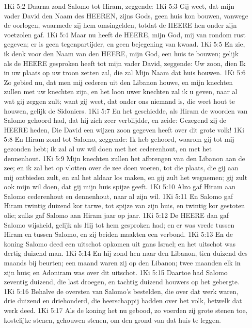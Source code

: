 1Ki 5:2  Daarna zond Salomo tot Hiram, zeggende:
1Ki 5:3  Gij weet, dat mijn vader David den Naam des HEEREN, zijns Gods, geen huis kon bouwen, vanwege de oorlogen, waarmede zij hem omsingelden, totdat de HEERE hen onder zijn voetzolen gaf.
1Ki 5:4  Maar nu heeft de HEERE, mijn God, mij van rondom rust gegeven; er is geen tegenpartijder, en geen bejegening van kwaad.
1Ki 5:5  En zie, ik denk voor den Naam van den HEERE, mijn God, een huis te bouwen; gelijk als de HEERE gesproken heeft tot mijn vader David, zeggende: Uw zoon, dien Ik in uw plaats op uw troon zetten zal, die zal Mijn Naam dat huis bouwen.
1Ki 5:6  Zo gebied nu, dat men mij cederen uit den Libanon houwe, en mijn knechten zullen met uw knechten zijn, en het loon uwer knechten zal ik u geven, naar al wat gij zeggen zult; want gij weet, dat onder ons niemand is, die weet hout te houwen, gelijk de Sidoniers.
1Ki 5:7  En het geschiedde, als Hiram de woorden van Salomo gehoord had, dat hij zich zeer verblijdde, en zeide: Gezegend zij de HEERE heden, Die David een wijzen zoon gegeven heeft over dit grote volk!
1Ki 5:8  En Hiram zond tot Salomo, zeggende: Ik heb gehoord, waarom gij tot mij gezonden hebt; ik zal al uw wil doen met het cederenhout, en met het dennenhout.
1Ki 5:9  Mijn knechten zullen het afbrengen van den Libanon aan de zee; en ik zal het op vlotten over de zee doen voeren, tot die plaats, die gij aan mij ontbieden zult, en zal het aldaar los maken, en gij zult het wegnemen; gij zult ook mijn wil doen, dat gij mijn huis spijze geeft.
1Ki 5:10  Alzo gaf Hiram aan Salomo cederenhout en dennenhout, naar al zijn wil.
1Ki 5:11  En Salomo gaf Hiram twintig duizend kor tarwe, tot spijze van zijn huis, en twintig kor gestoten olie; zulks gaf Salomo aan Hiram jaar op jaar.
1Ki 5:12  De HEERE dan gaf Salomo wijsheid, gelijk als Hij tot hem gesproken had; en er was vrede tussen Hiram en tussen Salomo, en zij beiden maakten een verbond.
1Ki 5:13  En de koning Salomo deed een uitschot opkomen uit gans Israel; en het uitschot was dertig duizend man.
1Ki 5:14  En hij zond hen naar den Libanon, tien duizend des maands bij beurten; een maand waren zij op den Libanon; twee maanden elk in zijn huis; en Adoniram was over dit uitschot.
1Ki 5:15  Daartoe had Salomo zeventig duizend, die last droegen, en tachtig duizend houwers op het gebergte.
1Ki 5:16  Behalve de oversten van Salomo's bestelden, die over dat werk waren, drie duizend en driehonderd, die heerschappij hadden over het volk, hetwelk dat werk deed.
1Ki 5:17  Als de koning het nu gebood, zo voerden zij grote stenen toe, kostelijke stenen, gehouwen stenen, om den grond van dat huis te leggen.
